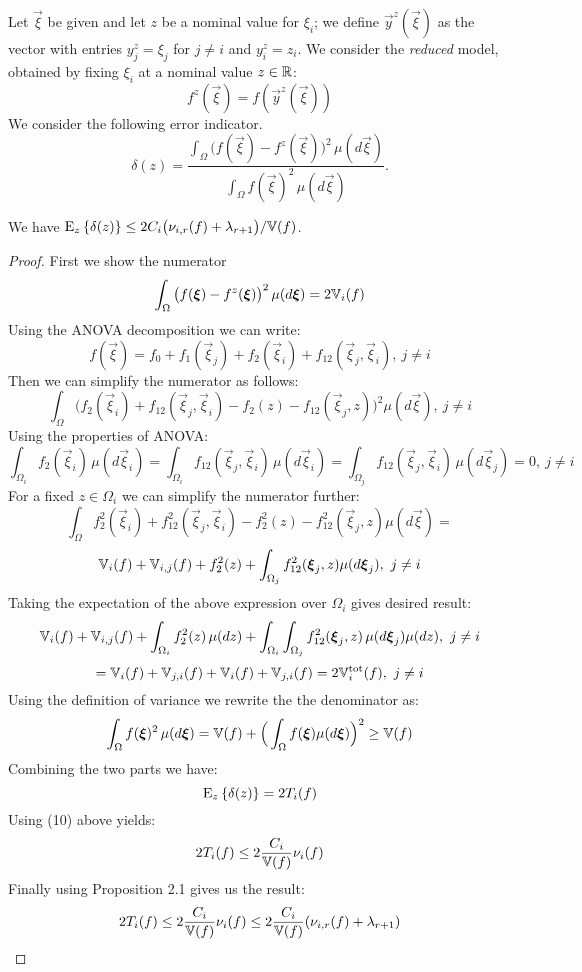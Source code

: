 Let $\vec\xi$ be given and let $z$ be a nominal value for $\xi_i$;  we define 
$\vec{y}^z(\vec\xi)$ as the vector with entries $y^z_j = \xi_j$ for $j \neq i$
and $y^z_i = z_i$.
We consider the \emph{reduced} model, 
obtained by fixing $\xi_i$ at a nominal value $z \in \R$: 
\[
f^{z}(\vec\xi) = f(\vec{y}^z(\vec\xi))
\] 
We consider the following error indicator.
\[
\delta(z) =
\frac{ \int_\Omega \big( f(\vec\xi) - f^{z}(\vec\xi)\big)^2 \, \mu(d\vec\xi) }
          {\int_\Omega f(\vec\xi)^2 \, \mu(d\vec\xi)}.
\] 

\begin{theorem}
We have $\Ez{ \delta(z)} \leq 2C_i\big(\act{f}{i}{r} + \lambda_{r+1}\big)/{\V(f)} $.
\end{theorem}
%
\begin{proof} 
First we show the numerator 
\[\int_\Omega \big( f(\vec\xi) - f^{z}(\vec\xi)\big)^2 \, \mu(d\vec\xi) = 2\V_{i}(f)  \]
Using the ANOVA decomposition we can write:
\[ f(\vec\xi) = f_0 + f_1(\vec\xi_j) + f_2(\vec\xi_{i}) + f_{12}(\vec\xi_j,\vec\xi_{i}), \ j \neq i\]
Then we can simplify the numerator as follows:
\[ \int_{\Omega} \big( f_2(\vec\xi_{i}) + f_{12}(\vec\xi_{j},\vec\xi_{i}) - f_2(z) -f_{12}(\vec\xi_{j},z)\big)^2\mu(d\vec\xi), \ j \neq i \]
Using the properties of ANOVA:
\[
\int_{\Omega_{i}} f_2(\vec\xi_{i}) \,\mu(d\vec\xi_{i}) 
= \int_{\Omega_{i}} f_{12}(\vec\xi_j, \vec\xi_{i})\,\mu(d\vec\xi_{i}) 
= \int_{\Omega_j} f_{12}(\vec\xi_j, \vec\xi_{i})\,\mu(d\vec\xi_j) = 0, \ j \neq i
\]
For a fixed $z \in \Omega_{i}$ we can simplify the numerator further:
\[ \int_{\Omega}  f_2^2(\vec\xi_{i}) + f_{12}^2(\vec\xi_{j},\vec\xi_{i}) - f_2^2(z) -f_{12}^2(\vec\xi_{j},z) \mu(d\vec\xi) = \]
\[ \V_{i}(f) + \V_{i,j}(f) + f_2^2(z) + \int_{\Omega_j} f_{12}^2(\vec\xi_j, z) \mu(d\vec\xi_j), \ j \neq i\]
Taking the expectation of the above expression over $\Omega_{i}$ gives 
desired result:
\[\V_{i}(f) + \V_{i,j}(f) + \int_{\Omega_{i}} f_2^2(z) \, \mu(dz)
+ \int_{\Omega_{i}}\int_{\Omega_j} f_{12}^2(\vec\xi_j,z)\,\mu (d\vec\xi_j)
\mu (dz), \ j \neq i \]
\[= \V_{i}(f) + \V_{j,i}(f) + \V_{i}(f) + \V_{j,i}(f) 
= 2 \V_{i}^\text{tot}(f), \ j \neq i \]
Using the definition of variance we rewrite the the denominator as:
\[
 \int_\Omega f(\vec\xi)^2\, \mu(d\vec\xi) 
=  \V(f) + 
\Big(\int_\Omega f(\vec\xi)\mu(d\vec\xi)\Big)^2 
\geq   \V(f) 
\]	
Combining the two parts we have:
\[ \Ez{ \delta(z)} = 2T_{i}(f) \]
Using (10) above yields:
\[2T_{i}(f) \leq 2\frac{C_{i}}{\V(f)}\nu_{i}(f) \]
Finally using Proposition 2.1 gives us the result:
\[2T_{i}(f) \leq 2\frac{C_{i}}{\V(f)}\nu_{i}(f) \leq 2\frac{C_{i}}{\V(f)}(\nu_{{i},r}(f) + \lambda_{r+1} ) \]
\end{proof}



